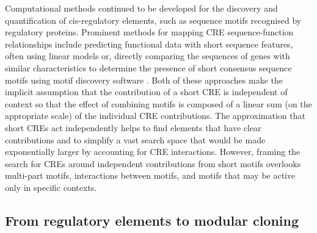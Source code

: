 \documentclass[../main.tex]{subfiles}
\begin{document}
Computational methods continued to be developed for the discovery and quantification of cis-regulatory elements, such as sequence motifs recognised by regulatory proteins.
Prominent methods for mapping CRE sequence-function relationships include predicting functional data with short sequence features, often using linear models \parencite{Shalgi2005,Cheng2017,Vijayabaskar2019} or, directly comparing the sequences of genes with similar characteristics to determine the presence of short
consensus sequence motifs \parencite{Hogan2008,Kretz2013} using motif discovery software \parencite{Elemento2007, Bailey2015}.
Both of these approaches make the implicit assumption that the contribution of a short CRE is independent of context so that the effect of combining motifs is composed of a linear sum (on the appropriate scale) of the individual CRE contributions.
The approximation that short CREs act independently helps to find elements that have clear contributions and to simplify a vast search space that would be made exponentially larger by accounting for CRE interactions. 
However, framing the search for CREs around independent contributions from short motifs overlooks multi-part motifs, interactions between motifs, and motifs that may be active only in specific contexts.

\subsection{From regulatory elements to modular cloning}
\end{document}
